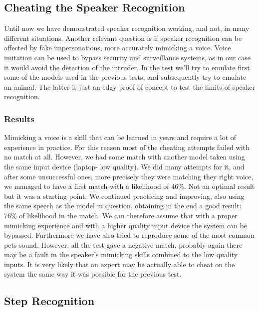 \subsection{Cheating the Speaker Recognition}

Until now we have demonstrated speaker recognition working, and not, in many different situations.
Another relevant question is if speaker recognition can be affected by fake impersonations,
more accurately mimicking a voice. Voice imitation can be used to bypass security and
surveillance systems, as in our case it would avoid the detection of the intruder.\newline
In the test we'll try to emulate first some of the models used in the previous tests, and subsequently
try to emulate an animal. The latter is just an edgy proof of concept to test the limits of speaker recognition.

\subsubsection{Results}

Mimicking a voice is a skill that can be learned in years and require a lot of experience in practice.
For this reason most of the cheating attempts failed with no match at all. However, we had some match
with another model taken using the same input device (laptop- low quality). We did many attempts for it, and
after some unsuccessful ones, more precisely they were matching they right voice, we managed to have a first
match with a likelihood of 46\%. Not an optimal result but it was a starting point. We continued practicing and
improving, also using the same speech as the model in question, obtaining in the end a good result: 76\% of likelihood
in the match. We can therefore assume that with a proper mimicking experience and with a higher quality input device
the system can be bypassed.\newline
Furthermore we have also tried to reproduce some of the most common pets sound. However, all the test
gave a negative match, probably again there may be a fault in the speaker's mimicking skills combined
to the low quality inputs. It is very likely that an expert may be actually able to cheat on the system the
same way it was possible for the previous test.

\subsection{Step Recognition}

